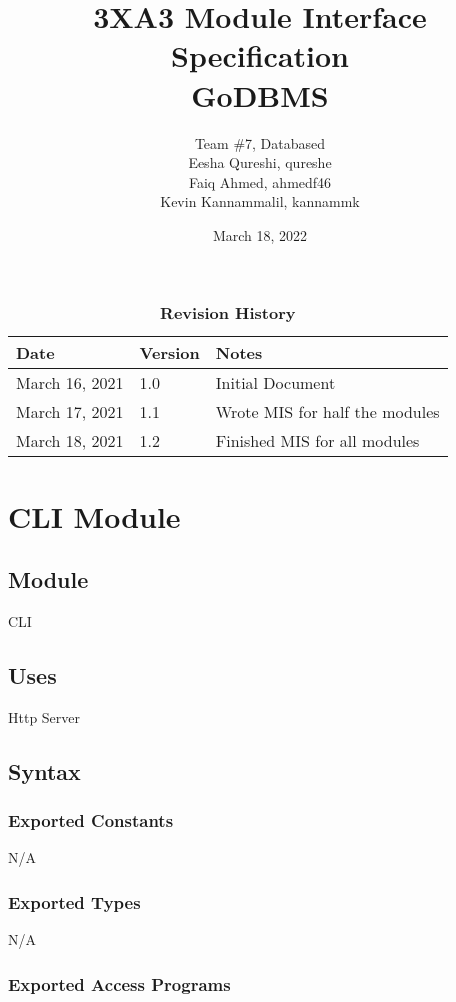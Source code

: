 \documentclass[12pt]{article}
\title{3XA3 Module Interface Specification\\ GoDBMS}
\author{Team \#7, Databased
    \\ Eesha Qureshi, qureshe
    \\ Faiq Ahmed, ahmedf46
    \\ Kevin Kannammalil, kannammk}
\date{March 18, 2022}
\begin{document}
 
\maketitle
\newpage
\tableofcontents
\listoftables
\listoffigures

\newpage
\begin{table}[h]
\caption{\bf Revision History}
\begin{tabularx}{\textwidth}{p{3cm}p{2cm}X}
\toprule {\bf Date} & {\bf Version} & {\bf Notes}\\
\midrule
March 16, 2021 & 1.0 & Initial Document\\
March 17, 2021 & 1.1 & Wrote MIS for half the modules\\
March 18, 2021 & 1.2 & Finished MIS for all modules\\
\bottomrule
\end{tabularx}
\end{table}

\newpage

\section {CLI Module}

\subsection{Module}
CLI

\subsection {Uses}
Http Server

\subsection {Syntax}

\subsubsection {Exported Constants}
N/A
\subsubsection {Exported Types}
N/A
\subsubsection {Exported Access Programs}
\end{document}
